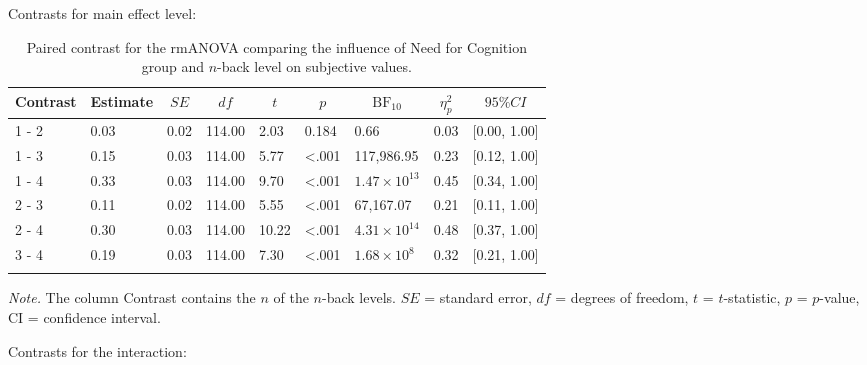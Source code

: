 \documentclass[
  man,floatsintext]{apa6}
\begin{document}
Contrasts for main effect level:

\begin{table}[H]

\begin{center}
\begin{threeparttable}

\caption{\label{tab:unnamed-chunk-16}Paired contrast for the rmANOVA comparing the influence of Need for Cognition group and $n$-back level on subjective values.}

\begin{tabular}{lllllllll}
\toprule
Contrast & \multicolumn{1}{c}{Estimate} & \multicolumn{1}{c}{$SE$} & \multicolumn{1}{c}{$df$} & \multicolumn{1}{c}{$t$} & \multicolumn{1}{c}{$p$} & \multicolumn{1}{c}{$\mathrm{BF}_{\textrm{10}}$} & \multicolumn{1}{c}{$\eta_{p}^{2}$} & \multicolumn{1}{c}{$95\% CI$}\\
\midrule
1 - 2 & 0.03 & 0.02 & 114.00 & 2.03 & 0.184 & 0.66 & 0.03 & {}[0.00, 1.00]\\
1 - 3 & 0.15 & 0.03 & 114.00 & 5.77 & <.001 & 117,986.95 & 0.23 & {}[0.12, 1.00]\\
1 - 4 & 0.33 & 0.03 & 114.00 & 9.70 & <.001 & $1.47 \times 10^{13}$ & 0.45 & {}[0.34, 1.00]\\
2 - 3 & 0.11 & 0.02 & 114.00 & 5.55 & <.001 & 67,167.07 & 0.21 & {}[0.11, 1.00]\\
2 - 4 & 0.30 & 0.03 & 114.00 & 10.22 & <.001 & $4.31 \times 10^{14}$ & 0.48 & {}[0.37, 1.00]\\
3 - 4 & 0.19 & 0.03 & 114.00 & 7.30 & <.001 & $1.68 \times 10^{8}$ & 0.32 & {}[0.21, 1.00]\\
\bottomrule
\addlinespace
\end{tabular}

\begin{tablenotes}[para]
\normalsize{\textit{Note.} The column Contrast contains the $n$ of the $n$-back levels. $SE$ = standard error, $df$ = degrees of freedom, $t$ = $t$-statistic, $p$ = $p$-value, CI = confidence interval.}
\end{tablenotes}

\end{threeparttable}
\end{center}

\end{table}

Contrasts for the interaction:
\end{document}
